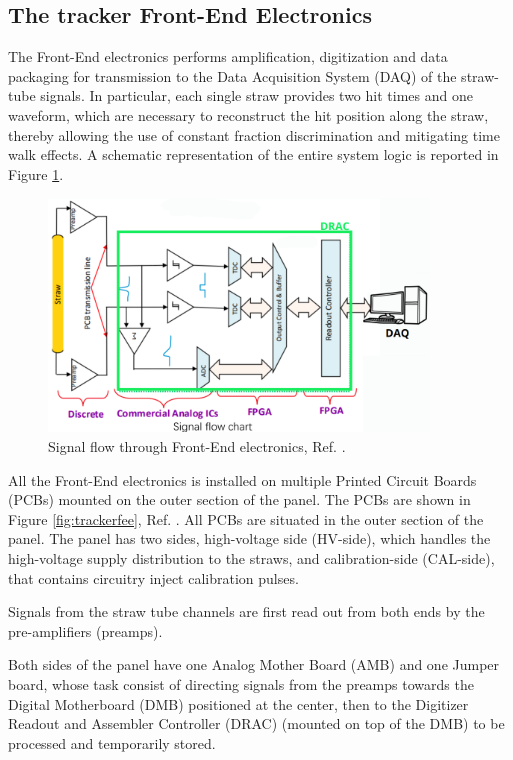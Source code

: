 \subsection{The tracker Front-End Electronics}\label{tfee}
The Front-End electronics performs amplification, digitization and data packaging 
for transmission to the Data Acquisition System (DAQ) of the straw-tube signals. 
In particular, each single straw provides two hit times and one waveform, 
which are necessary to reconstruct the hit position along the straw, 
thereby allowing the use of constant fraction discrimination and mitigating time walk effects. 
A schematic representation of the entire system logic is reported in Figure \ref{fig:flowfee}.
\begin{figure}[!h]
    \centering
    \includegraphics[width =0.9\textwidth]{figures/png/Screenshot_20240529_133230.png}
    \caption[Signal flow through Front-End electronics.]{Signal flow through Front-End electronics, Ref. \cite{bartoszek2015mu2e}.}
    \label{fig:flowfee}
    \end{figure}
All the Front-End electronics is installed on multiple Printed Circuit Boards 
(PCBs) mounted on the outer section of the panel. 
The PCBs are shown in Figure \ref{fig:trackerfee}, Ref. \cite{vadimmu2e}.
All PCBs are situated in the outer section of the panel. 
The panel has two sides,  high-voltage side (HV-side), 
which handles the high-voltage supply distribution to the straws, and 
 calibration-side (CAL-side), that contains  circuitry
 inject  calibration pulses.

Signals from the straw tube channels are first read 
out from both ends by the pre-amplifiers (preamps).

Both sides of the panel have one Analog Mother Board (AMB) and one Jumper board, 
whose task consist of directing signals from the preamps towards the Digital 
Motherboard (DMB) positioned at the center, then to the Digitizer Readout and 
Assembler Controller (DRAC) (mounted on top of the DMB) to be processed and 
temporarily stored. 

